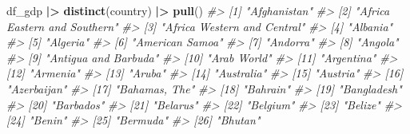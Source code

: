 \documentclass[
  xelatex, ja=standard]{bxjsbook}
\newenvironment{Shaded}{\begin{snugshade}}{\end{snugshade}}
\newcommand{\CommentTok}[1]{\textcolor[rgb]{0.56,0.35,0.01}{\textit{#1}}}
\newcommand{\FunctionTok}[1]{\textcolor[rgb]{0.13,0.29,0.53}{\textbf{#1}}}
\newcommand{\NormalTok}[1]{#1}
\newcommand{\SpecialCharTok}[1]{\textcolor[rgb]{0.81,0.36,0.00}{\textbf{#1}}}
\theoremstyle{definition}
\theoremstyle{definition}
\theoremstyle{definition}
\theoremstyle{definition}
\theoremstyle{remark}
\begin{document}
\begin{Shaded}
\begin{Highlighting}[]
\NormalTok{df\_gdp }\SpecialCharTok{|\textgreater{}} \FunctionTok{distinct}\NormalTok{(country) }\SpecialCharTok{|\textgreater{}} \FunctionTok{pull}\NormalTok{()}
\CommentTok{\#\textgreater{}   [1] "Afghanistan"                                         }
\CommentTok{\#\textgreater{}   [2] "Africa Eastern and Southern"                         }
\CommentTok{\#\textgreater{}   [3] "Africa Western and Central"                          }
\CommentTok{\#\textgreater{}   [4] "Albania"                                             }
\CommentTok{\#\textgreater{}   [5] "Algeria"                                             }
\CommentTok{\#\textgreater{}   [6] "American Samoa"                                      }
\CommentTok{\#\textgreater{}   [7] "Andorra"                                             }
\CommentTok{\#\textgreater{}   [8] "Angola"                                              }
\CommentTok{\#\textgreater{}   [9] "Antigua and Barbuda"                                 }
\CommentTok{\#\textgreater{}  [10] "Arab World"                                          }
\CommentTok{\#\textgreater{}  [11] "Argentina"                                           }
\CommentTok{\#\textgreater{}  [12] "Armenia"                                             }
\CommentTok{\#\textgreater{}  [13] "Aruba"                                               }
\CommentTok{\#\textgreater{}  [14] "Australia"                                           }
\CommentTok{\#\textgreater{}  [15] "Austria"                                             }
\CommentTok{\#\textgreater{}  [16] "Azerbaijan"                                          }
\CommentTok{\#\textgreater{}  [17] "Bahamas, The"                                        }
\CommentTok{\#\textgreater{}  [18] "Bahrain"                                             }
\CommentTok{\#\textgreater{}  [19] "Bangladesh"                                          }
\CommentTok{\#\textgreater{}  [20] "Barbados"                                            }
\CommentTok{\#\textgreater{}  [21] "Belarus"                                             }
\CommentTok{\#\textgreater{}  [22] "Belgium"                                             }
\CommentTok{\#\textgreater{}  [23] "Belize"                                              }
\CommentTok{\#\textgreater{}  [24] "Benin"                                               }
\CommentTok{\#\textgreater{}  [25] "Bermuda"                                             }
\CommentTok{\#\textgreater{}  [26] "Bhutan"                                              }

\end{Highlighting}
\end{Shaded}
\end{document}
